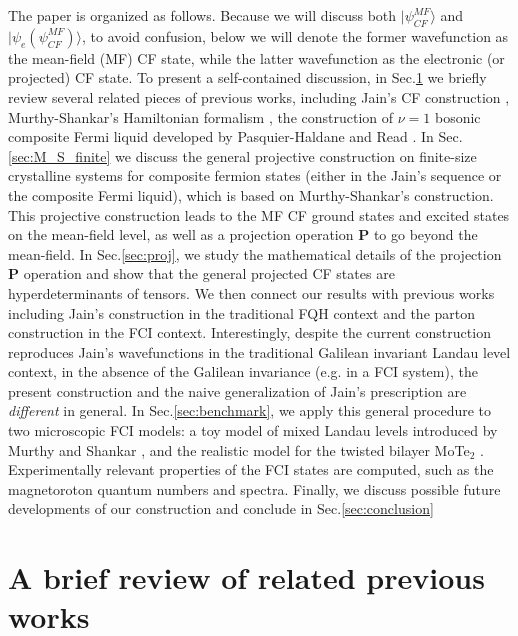 The paper is organized as follows. Because we will discuss both $|\psi^{MF}_{CF}\rangle$ and $|\psi_{e}(\psi^{MF}_{CF})\rangle$, to avoid confusion, below we will denote the former wavefunction as the mean-field (MF) CF state, while the latter wavefunction as the electronic (or projected) CF state.  To present a self-contained discussion, in Sec.\ref{sec:review} we briefly review several related pieces of previous works, including Jain's CF construction \cite{jain1990theory}, Murthy-Shankar's Hamiltonian formalism \cite{murthy2003hamiltonian}, the construction of $\nu=1$ bosonic composite Fermi liquid developed by Pasquier-Haldane \cite{pasquier1998dipole} and Read \cite{read1998lowest}. In Sec.\ref{sec:M_S_finite} we discuss the general projective construction on finite-size crystalline systems for composite fermion states (either in the Jain's sequence or the composite Fermi liquid), which is based on Murthy-Shankar's construction.  This projective construction leads to the MF CF ground states and excited states on the mean-field level, as well as a projection operation $\mathbf P$ to go beyond the mean-field. In Sec.\ref{sec:proj}, we study the mathematical details of the projection $\mathbf P$ operation and show that the general projected CF states are hyperdeterminants of tensors. We then connect our results with previous works including Jain's construction in the traditional FQH context and the parton construction in the FCI context. Interestingly, despite the current construction reproduces Jain's wavefunctions in the traditional Galilean invariant Landau level context, in the absence of the Galilean invariance (e.g. in a FCI system), the present construction and the naive generalization of Jain's prescription are \emph{different} in general. In Sec.\ref{sec:benchmark}, we apply this general procedure to two microscopic FCI models: a toy model of mixed Landau levels introduced by Murthy and Shankar \cite{murthy2012hamiltonian}, and the realistic model for the twisted bilayer MoTe$_2$ \cite{wang2023fractional}. Experimentally relevant properties of the FCI states are computed, such as the magnetoroton quantum numbers and spectra. Finally, we discuss possible future developments of our construction and conclude in Sec.\ref{sec:conclusion}


\section{A brief review of related previous works}\label{sec:review}
